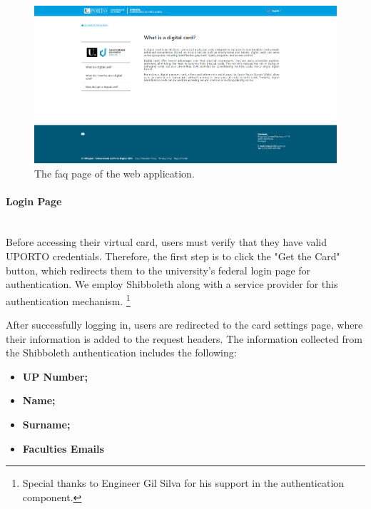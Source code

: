 \documentclass[12pt]{article}
\begin{document}
\begin{figure}[H]
	\centering
	\includegraphics[width=\textwidth]{faq_page.png}
	\caption{The faq page of the web application.}
\end{figure}

\paragraph{Login Page}\mbox{}\\
Before accessing their virtual card, users must verify that they
have valid UPORTO credentials. Therefore, the first step is to click the "Get the Card"
button, which redirects them to the university's federal login page for authentication. We employ Shibboleth
along with a service provider for this authentication mechanism.
\footnote{Special thanks to Engineer Gil Silva for his support in the authentication component.}

After successfully logging in, users are redirected to the card
settings page, where their information is added to the
request headers. The information collected from the
Shibboleth authentication includes the following:


\begin{itemize}
	\item \textbf{UP Number;}
	\item \textbf{Name;}
	\item \textbf{Surname;}
	\item \textbf{Faculties Emails}
\end{itemize}
\end{document}
